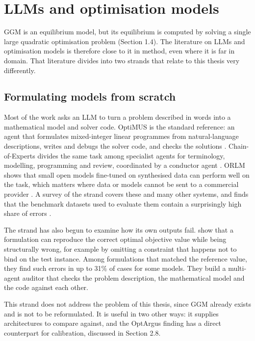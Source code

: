 \section{LLMs and optimisation models}

GGM is an equilibrium model, but its equilibrium is computed by solving a single large quadratic optimisation problem (Section 1.4).
The literature on LLMs and optimisation models is therefore close to it in method, even where it is far in domain.
That literature divides into two strands that relate to this thesis very differently.

\subsection{Formulating models from scratch}

Most of the work asks an LLM to turn a problem described in words into a mathematical model and solver code.
OptiMUS is the standard reference: an agent that formulates mixed-integer linear programmes from natural-language descriptions, writes and debugs the solver code, and checks the solutions \citep{ahmaditeshnizi2024optimus}.
Chain-of-Experts divides the same task among specialist agents for terminology, modelling, programming and review, coordinated by a conductor agent \citep{xiao2024chain}.
ORLM shows that small open models fine-tuned on synthesised data can perform well on the task, which matters where data or models cannot be sent to a commercial provider \citep{huang2025orlm}.
A survey of the strand covers these and many other systems, and finds that the benchmark datasets used to evaluate them contain a surprisingly high share of errors \citep{xiao2025survey}.

The strand has also begun to examine how its own outputs fail.
\citet{li2026optargus} show that a formulation can reproduce the correct optimal objective value while being structurally wrong, for example by omitting a constraint that happens not to bind on the test instance.
Among formulations that matched the reference value, they find such errors in up to 31\% of cases for some models.
They build a multi-agent auditor that checks the problem description, the mathematical model and the code against each other.

This strand does not address the problem of this thesis, since GGM already exists and is not to be reformulated.
It is useful in two other ways: it supplies architectures to compare against, and the OptArgus finding has a direct counterpart for calibration, discussed in Section 2.8.

